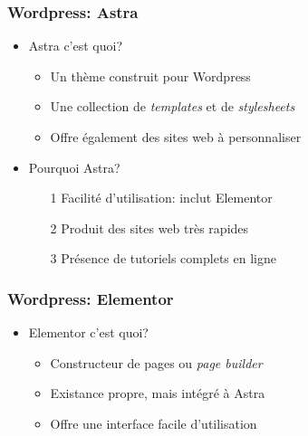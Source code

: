 \documentclass{beamer}
\begin{document}
    \begin{frame}
      \frametitle{Wordpress: Astra}
      \begin{itemize}
        \item<2-> Astra c'est quoi? 
          \begin{itemize}
            \item Un thème construit pour Wordpress
            \item Une collection de \textit{templates} et de \textit{stylesheets}
            \item Offre également des sites web à personnaliser 
          \end{itemize}
        \item<3-> Pourquoi Astra?
          \begin{enumerate}
            \item[1] Facilité d'utilisation: inclut Elementor
            \item[2] Produit des sites web très rapides
            \item[3] Présence de tutoriels complets en ligne
          \end{enumerate}
        \end{itemize}
      \end{frame}
      
      \begin{frame}
        \frametitle{Wordpress: Elementor}
        \begin{itemize}
          \item<2-> Elementor c'est quoi? 
            \begin{itemize}
              \item Constructeur de pages ou \textit{page builder}
              \item Existance propre, mais intégré à Astra
              \item Offre une interface facile d'utilisation
            \end{itemize}
        \end{itemize}
      \end{frame}
        
\end{document}

